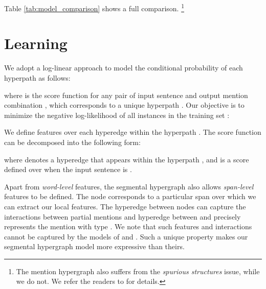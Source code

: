 \documentclass[11pt,a4paper]{article}
\theoremstyle{theorem}
\begin{document}
Table \ref{tab:model_comparison} shows a full comparison.
\footnote{The mention hypergraph \cite{lu2015joint} also suffers from the {\em spurious structures} issue, while we do not. We refer the readers to \cite{muis2017labeling} for details.}



\section{Learning}







We adopt a log-linear approach to model the conditional probability of each hyperpath as follows:
\begin{center}
\vspace{-3mm}
\small

\vspace{-3mm}
\end{center}
where  is the score function for any pair of input sentence  and output mention combination , which corresponds to a unique hyperpath . 
Our objective is to minimize the negative log-likelihood of all instances in the training set :
\begin{center}
\vspace{-3mm}
\small

\vspace{-3mm}
\end{center}

We define features over each hyperedge within the hyperpath .
The score function can be decomposed into the following form:
\begin{center}
\vspace{-3mm}
\small

\vspace{-3mm}
\end{center}
where  denotes a hyperedge that appears within the hyperpath , and  is a score defined over    when the input sentence is .

{\color{black}
Apart from {\em word-level} features, the segmental hypergraph also allows {\em span-level} features to be defined.
The node  corresponds to a particular span  over which we can extract our local features.
The hyperedge between  nodes can capture the interactions between partial mentions and 
hyperedge between  and  precisely represents the mention  with type .
We note that such features and interactions cannot be captured by the models of \cite{lu2015joint} and \cite{muis2017labeling}.
Such a unique property makes our segmental hypergraph model more expressive than theirs.
}
\end{document}
